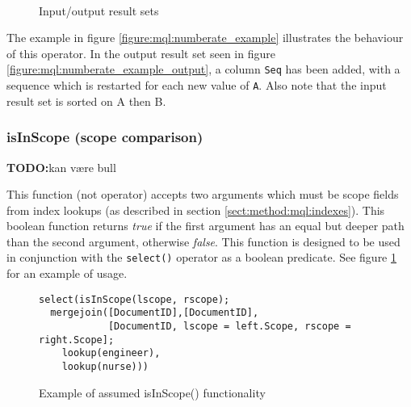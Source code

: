 \begin{figure}[!h]
\centering
\mbox{
\quad
{}
}
\caption{Input/output result sets}
\end{figure}
The example in figure \ref{figure:mql:numberate_example} illustrates the
behaviour of this operator. In the output result set seen in figure
\ref{figure:mql:numberate_example_output}, a column \texttt{Seq} has been
added, with a sequence which is restarted for each new value of \texttt{A}.
Also note that the input result set is sorted on A then B.

\subsubsection{isInScope (scope comparison)}
\textbf{\LARGE TODO:}kan v\ae re bull

This function (not operator) accepts two arguments which must be scope fields
from index lookups (as described in section \ref{sect:method:mql:indexes}).
This boolean function returns \textit{true} if the first argument has an equal
but deeper path than the second argument, otherwise \textit{false}. This
function is designed to be used in conjunction with the \texttt{select()}
operator as a boolean predicate. See figure \ref{figure:mql:isinscope_example}
for an example of usage.

\begin{figure}[!h]
\centering
\begin{Verbatim}
select(isInScope(lscope, rscope);
  mergejoin([DocumentID],[DocumentID], 
            [DocumentID, lscope = left.Scope, rscope = right.Scope];
    lookup(engineer),
    lookup(nurse)))
\end{Verbatim}
\caption{Example of assumed isInScope() functionality}
\label{figure:mql:isinscope_example}
\end{figure}


